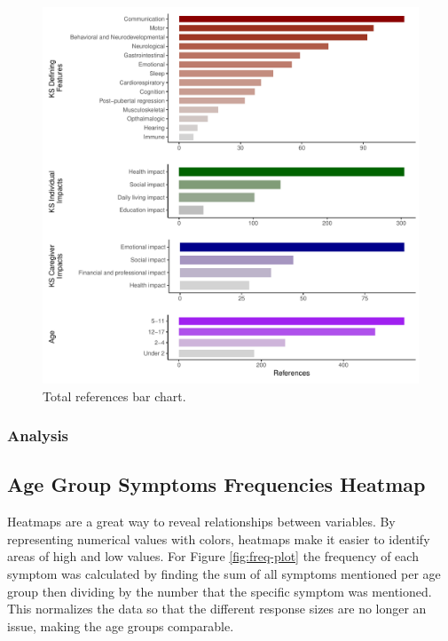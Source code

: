 \documentclass[
]{article}
\begin{document}
\begin{figure}
\centering
\includegraphics{Report_files/figure-latex/bar-plot-1.pdf}
\caption{\label{fig:bar-plot}Total references bar chart.}
\end{figure}

\hypertarget{analysis}{%
\subsubsection{Analysis}\label{analysis}}

\hypertarget{age-group-symptoms-frequencies-heatmap}{%
\subsection{Age Group Symptoms Frequencies Heatmap}\label{age-group-symptoms-frequencies-heatmap}}

Heatmaps are a great way to reveal relationships between variables. By representing numerical values with colors, heatmaps make it easier to identify areas of high and low values. For Figure \ref{fig:freq-plot} the frequency of each symptom was calculated by finding the sum of all symptoms mentioned per age group then dividing by the number that the specific symptom was mentioned. This normalizes the data so that the different response sizes are no longer an issue, making the age groups comparable.
\end{document}
